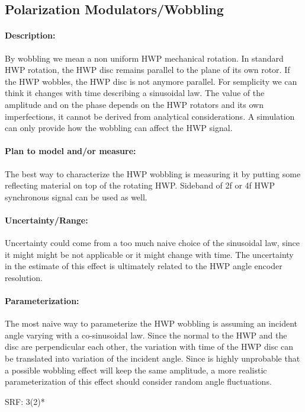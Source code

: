 \subsection{Polarization Modulators/Wobbling}

\paragraph{Description:}
By wobbling we mean a non uniform HWP mechanical rotation. In standard HWP rotation, the HWP disc remains parallel to the plane 
of its own rotor. If the HWP wobbles, the HWP disc is not anymore parallel. For semplicity we can think it changes with time describing
a sinusoidal law. The value of the amplitude and on the phase depends on the HWP rotators and its own imperfections,  it cannot be derived 
from analytical considerations. A simulation can only provide how the wobbling can affect the HWP signal. 

\paragraph{Plan to model and/or measure:}
The best way to characterize the HWP wobbling is measuring it by putting some reflecting material on top of the rotating HWP. 
Sideband of 2f or 4f HWP synchronous signal
can be used as well.

\paragraph{Uncertainty/Range:}
Uncertainty could come from a too much naive choice of the sinusoidal law, since it might
might be not applicable or it might change with time. The uncertainty in the estimate of this effect is ultimately 
related to the HWP angle encoder resolution.

\paragraph{Parameterization:}
The most naive way to parameterize the HWP wobbling is assuming an incident angle varying with a co-sinusoidal law.
Since the normal to the HWP and the disc are perpendicular each other, the variation with time of the HWP disc can be translated
into variation of the incident angle. Since is highly unprobable that a possible wobbling effect will keep the same amplitude,
a more realistic parameterization of this effect should consider random angle fluctuations.

SRF: 3(2)*
